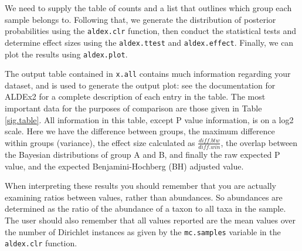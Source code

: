 \documentclass[11pt]{article}\usepackage[]{graphicx}\usepackage[]{color}
\begin{document}
We need to supply the table of counts and a list that outlines which group each sample belongs to. Following that, we generate the distribution of posterior probabilities using the {\tt aldex.clr} function, then conduct the statistical tests and determine effect sizes using the {\tt aldex.ttest} and {\tt aldex.effect}. Finally, we can plot the results using {\tt aldex.plot}. 

The output table contained in {\tt x.all} contains much information regarding your dataset, and is used to generate the output plot: see the documentation for ALDEx2 for a complete description of each entry in the table. The most important data for the purposes of comparison are those given in Table \ref{sig.table}. All information in this table, except P value information, is on a log2 scale. Here we have the difference between groups, the maximum difference within groups (variance), the effect size calculated as $\frac{diff.btw}{diff.win}$, the overlap between the Bayesian distributions of group A and B, and finally the raw expected P value, and the expected Benjamini-Hochberg (BH) adjusted value.  

When interpreting these results you should remember that you are actually examining ratios between values, rather than abundances. So abundances are determined as the ratio of the abundance of a taxon to all taxa in the sample. The user should also remember that all values reported are the mean values over the number of Dirichlet instances as given by the {\tt mc.samples} variable in the {\tt aldex.clr} function.
 
\end{document}
